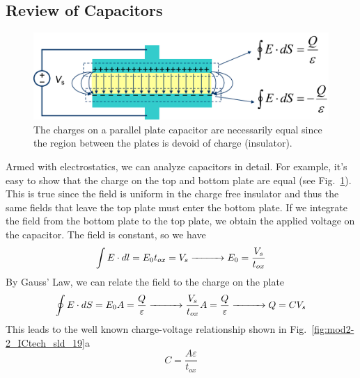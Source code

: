 \subsection{Review of Capacitors}
\begin{figure}[tbh]
\centering
\includegraphics[width=.75\columnwidth]{mod2-2_ICtech_sld_18}
\caption{The charges on a parallel plate capacitor are necessarily equal since the region between the plates is devoid of charge (insulator).}
\label{fig:mod2-2_ICtech_sld_18}
\end{figure}
Armed with electrostatics, we can analyze capacitors in detail.  For example, it's easy to show that the charge on the top and bottom plate are equal (see Fig.~\ref{fig:mod2-2_ICtech_sld_18}).  This is true since the field is uniform in the charge free insulator and thus the same fields that leave the top plate must enter the bottom plate.
If we integrate the field from the bottom plate to the top plate, we obtain the applied voltage on the capacitor.  The field is constant, so we have
    \begin{equation} 
        \int {E \cdot dl}  = {E_0}{t_{ox}} = {V_s}  \xrightarrow{\hspace*{1cm}}{E_0} = \frac{{{V_s}}}{{{t_{ox}}}} 
    \end{equation}
By Gauss' Law, we can relate the field to the charge on the plate
    \begin{equation} 
        \oint {E \cdot dS = {E_0}A = \frac{Q}{\varepsilon }}  \xrightarrow{\hspace*{1cm}}
        \frac{{{V_s}}}{{{t_{ox}}}}A = \frac{Q}{\varepsilon } \xrightarrow{\hspace*{1cm}}
        Q = C{V_s}
    \end{equation}
This leads to the well known charge-voltage relationship shown in Fig.~\ref{fig:mod2-2_ICtech_sld_19}a
    \begin{equation} 
        C = \frac{{A\varepsilon }}{{{t_{ox}}}}
    \end{equation}
